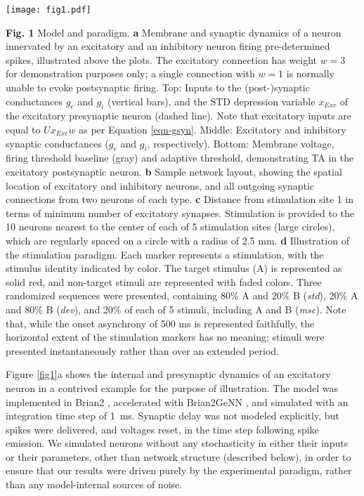 \documentclass[pdflatex,referee,iicol,sn-basic]{sn-jnl}
\newcommand{\dev}{\textit{dev}}
\newcommand{\msc}{\textit{msc}}
\newcommand{\std}{\textit{std}}
\theoremstyle{thmstyleone}%
\theoremstyle{thmstyletwo}%
\theoremstyle{thmstylethree}%
\begin{document}
\begin{figure*}%
    \centering
    \texttt{[image: fig1.pdf]}
    \caption{}
    \label{fig1}
\end{figure*}
\textbf{Fig. 1} Model and paradigm. \textbf{a} Membrane and synaptic dynamics of a neuron innervated by an excitatory and an inhibitory neuron firing pre-determined spikes, illustrated above the plots. The excitatory connection has weight $w = 3$ for demonstration purposes only; a single connection with $w = 1$ is normally unable to evoke postsynaptic firing. Top: Inputs to the (post-)synaptic conductances $g_e$ and $g_i$ (vertical bars), and the STD depression variable $x_{Exc}$ of the excitatory presynaptic neuron (dashed line). Note that excitatory inputs are equal to $U x_{Exc} w$ as per Equation \ref{eqn-gsyn}. Middle: Excitatory and inhibitory synaptic conductances ($g_e$ and $g_i$, respectively). Bottom: Membrane voltage, firing threshold baseline (gray) and adaptive threshold, demonstrating TA in the excitatory postsynaptic neuron. \textbf{b} Sample network layout, showing the spatial location of excitatory and inhibitory neurons, and all outgoing synaptic connections from two neurons of each type. \textbf{c} Distance from stimulation site 1 in terms of minimum number of excitatory synapses. Stimulation is provided to the 10 neurons nearest to the center of each of 5 stimulation sites (large circles), which are regularly spaced on a circle with a radius of 2.5 mm. \textbf{d} Illustration of the stimulation paradigm. Each marker represents a stimulation, with the stimulus identity indicated by color. The target stimulus (A) is represented as solid red, and non-target stimuli are represented with faded colors. Three randomized sequences were presented, containing 80\% A and 20\% B (\std{}), 20\% A and 80\% B (\dev{}), and 20\% of each of 5 stimuli, including A and B (\msc{}). Note that, while the onset asynchrony of 500 ms is represented faithfully, the horizontal extent of the stimulation markers has no meaning; stimuli were presented instantaneously rather than over an extended period.

Figure \ref{fig1}a shows the internal and presynaptic dynamics of an excitatory neuron in a contrived example for the purpose of illustration. The model was implemented in Brian2 \citep{Stimberg2019-tc}, accelerated with Brian2GeNN \citep{Stimberg2020-go}, and simulated with an integration time step of 1~ms. Synaptic delay was not modeled explicitly, but spikes were delivered, and voltages reset, in the time step following spike emission. We simulated neurons without any stochasticity in either their inputs or their parameters, other than network structure (described below), in order to ensure that our results were driven purely by the experimental paradigm, rather than any model-internal sources of noise.
\end{document}
